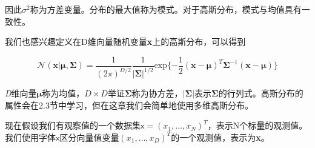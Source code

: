 	因此$\sigma^2$称为方差变量。分布的最大值称为模式。对于高斯分布，模式与均值具有一致性。
	
	我们也感兴趣定义在D维向量随机变量\textbf{x}上的高斯分布，可以得到
	
	\begin{equation}
	\mathcal{N}( \mathbf{x}  |  \mathbf{\mu} , \mathbf{ \Sigma }) = \frac{1}{(2\pi)^{D/2}} \frac{1}{ |\mathbf{\Sigma}|^{1/2} }\mathrm{exp} \{ -\frac{1}{2}(\mathbf{ x } - \mathbf{ \mu })^T \mathbf{\Sigma}^{-1}(\mathbf{x} - \mathbf{\mu}) \}
	\end{equation}
	
	\textit{D}维向量$\mathbf{\mu}$称为均值，$D \times D$举证$\mathbf{\Sigma}$称为协方差，$|\mathbf{\Sigma}|$表示$\mathbf{\Sigma}$的行列式。高斯分布的属性会在2.3节中学习，但在这章我们会简单地使用多维高斯分布。
	
	现在假设我们有观察值的一个数据集$\mathsf{x} = (x_1, \dots, x_N)^T$，表示N个标量的观测值。我们使用字体$\mathsf{x}$区分向量值变量$(x_1, \dots, x_D)^T$的一个观测值，表示为\textbf{x}。
	